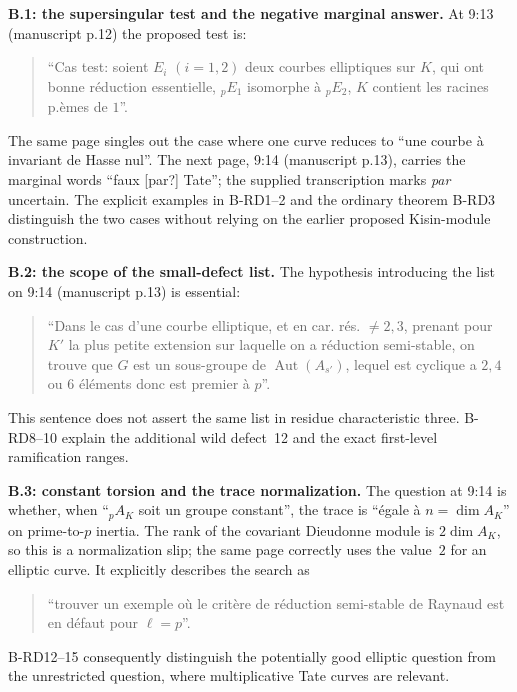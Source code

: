 \par\smallskip\noindent\textbf{B.1: the supersingular test and the negative marginal answer.}
At 9:13 (manuscript p.12) the proposed test is:
\begin{quote}
``Cas test: soient $E_i$ $(i=1,2)$ deux courbes elliptiques sur $K$,
qui ont bonne réduction essentielle, ${}_pE_1$ isomorphe à
${}_pE_2$, $K$ contient les racines p.èmes de $1$''.
\end{quote}
The same page singles out the case where one curve reduces to
``une courbe à invariant de Hasse nul''. The next page, 9:14
(manuscript p.13), carries the marginal words ``faux [par?] Tate'';
the supplied transcription marks \emph{par} uncertain. The explicit
examples in B-RD1--2 and the ordinary theorem B-RD3 distinguish the
two cases without relying on the earlier proposed Kisin-module
construction.

\par\smallskip\noindent\textbf{B.2: the scope of the small-defect list.}
The hypothesis introducing the list on 9:14 (manuscript p.13) is
essential:
\begin{quote}
``Dans le cas d'une courbe elliptique, et en car. rés. $\ne 2,3$,
prenant pour $K'$ la plus petite extension sur laquelle on a
réduction semi-stable, on trouve que $G$ est un sous-groupe de
$\operatorname{Aut}(A_{s'})$, lequel est cyclique a $2,4$ ou $6$
éléments donc est premier à $p$''.
\end{quote}
This sentence does not assert the same list in residue
characteristic three. B-RD8--10 explain the additional wild
defect~12 and the exact first-level ramification ranges.

\par\smallskip\noindent\textbf{B.3: constant torsion and the trace normalization.}
The question at 9:14 is whether, when
``${}_pA_K$ soit un groupe constant'', the trace is
``égale à $n=\dim A_K$'' on prime-to-$p$ inertia. The rank of the
covariant Dieudonne module is $2\dim A_K$, so this is a normalization
slip; the same page correctly uses the value~$2$ for an elliptic
curve. It explicitly describes the search as
\begin{quote}
``trouver un exemple où le critère de réduction semi-stable de
Raynaud est en défaut pour $\ell=p$''.
\end{quote}
B-RD12--15 consequently distinguish the potentially good elliptic
question from the unrestricted question, where multiplicative
Tate curves are relevant.

